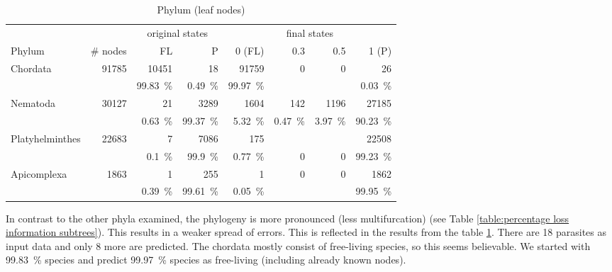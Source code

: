       \begin{table}[h]
        \begin{center}
          \begin{tabular}{ |l|r||r|r||r|r|r|r| }
            \hline
            & & \multicolumn{2}{c||}{original states} & \multicolumn{4}{c|}{final states} \\
            Phylum & \# nodes       & FL & P              & 0 (FL) & 0.3 & 0.5 & 1 (P) \\
            \hline \hline
            Chordata & 91785        & 10451 & 18          & 91759 & 0 & 0 & 26 \\
            &                       & 99.83~\% & 0.49~\%  & 99.97~\% & & & 0.03~\% \\ \hline
            Nematoda & 30127        & 21 & 3289           & 1604 & 142 & 1196 & 27185 \\
            &                       & 0.63~\% & 99.37~\%  & 5.32~\% & 0.47~\% & 3.97~\% & 90.23~\% \\ \hline
            Platyhelminthes & 22683 & 7 & 7086            & 175 & & & 22508 \\
            &                       & 0.1~\% & 99.9~\%    & 0.77~\% & 0 & 0 & 99.23~\% \\ \hline
            Apicomplexa & 1863      & 1 & 255             & 1 & 0 & 0 & 1862 \\
            &                       & 0.39~\% & 99.61~\%  & 0.05~\% & & & 99.95~\% \\
            \hline
          \end{tabular} 
        \end{center}
        \caption{Phylum (leaf nodes)}
        \label{table:phylum leaf nodes states} 
      \end{table}

      In contrast to the other phyla examined, the phylogeny is more pronounced (less multifurcation) (see 
        Table \ref{table:percentage loss information subtrees}). This results in a weaker spread of errors. 
        This is reflected in the results from the table \ref{table:phylum leaf nodes states}. There are 18 
        parasites as input data and only 8 more are predicted. The chordata mostly consist of free-living 
        species, so this seems believable. We started with 99.83~\%  species and predict 99.97~\% species 
        as free-living (including already known nodes). 

